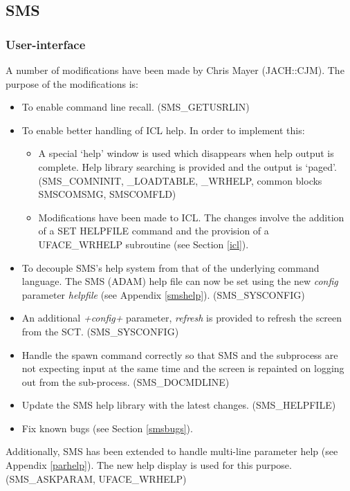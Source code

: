 \subsection{SMS}
\subsubsection{User-interface}
\label{sms}
A number of modifications have been made by Chris Mayer (JACH::CJM)\@.
The purpose of the modifications is:
\begin{itemize}
\item To enable command line recall. (SMS\_GETUSRLIN)
\item To enable better handling of ICL help.
In order to implement this:
\begin{itemize}
\item A special `help' window is used which disappears when help output is
complete. Help library searching is provided and the output is `paged'\@.
(SMS\_COMNINIT, \_LOAD\-TABLE, \_WRHELP, common blocks SMSCOMSMG, SMSCOMFLD)
\item Modifications have been made to ICL.
The changes involve the addition of a SET HELPFILE command and the provision 
of a UFACE\_WRHELP subroutine (see Section \ref{icl}).
\end{itemize}

\item To decouple SMS's help system from that of the underlying command
language. The SMS (ADAM) help file can now be set using the new {\em config}
parameter {\em helpfile} (see Appendix \ref{smshelp}).
(SMS\-\_SYS\-CONFIG)
\item An additional {\em +config+} parameter, {\em refresh} is provided to
refresh the screen from the SCT\@. (SMS\-\_SYS\-CONFIG)
\item Handle the spawn command correctly so that SMS and the
subprocess are not expecting input at the same time and
the screen is repainted on logging out from the sub-process. (SMS\_DOCMDLINE)
\item Update the SMS help library with the latest changes. (SMS\_HELPFILE)
\item Fix known bugs (see Section \ref{smsbugs}).
\end{itemize}

Additionally, SMS has been extended to handle multi-line parameter help
(see Appendix \ref{parhelp}). The new help display is used for this
purpose. (SMS\_ASKPARAM, UFACE\_WRHELP)

